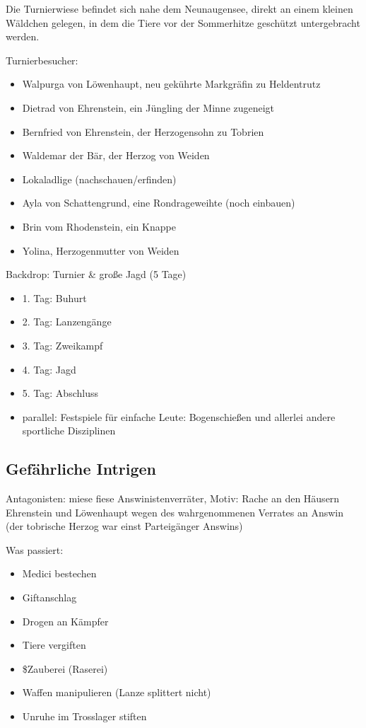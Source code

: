 Die Turnierwiese befindet sich nahe dem Neunaugensee, direkt an einem kleinen Wäldchen gelegen, in dem die Tiere vor der Sommerhitze geschützt untergebracht werden.

Turnierbesucher: 

\begin{itemize}
	\item Walpurga von Löwenhaupt, neu gekührte Markgräfin zu Heldentrutz
	\item Dietrad von Ehrenstein, ein Jüngling der Minne zugeneigt
	\item Bernfried von Ehrenstein, der Herzogensohn zu Tobrien
	\item Waldemar der Bär, der Herzog von Weiden
	\item Lokaladlige (nachschauen/erfinden)
	\item Ayla von Schattengrund, eine Rondrageweihte (noch einbauen)
	\item Brin vom Rhodenstein, ein Knappe
	\item Yolina, Herzogenmutter von Weiden
\end{itemize}

Backdrop: Turnier \& große Jagd (5 Tage)

\begin{itemize}
	\item 1. Tag: Buhurt
	\item 2. Tag: Lanzengänge
	\item 3. Tag: Zweikampf
	\item 4. Tag: Jagd
	\item 5. Tag: Abschluss
	\item parallel: Festspiele für einfache Leute: Bogenschießen und allerlei andere sportliche Disziplinen
\end{itemize}

\subsection{Gefährliche Intrigen}

Antagonisten: miese fiese Answinistenverräter, Motiv: Rache an den Häusern Ehrenstein und Löwenhaupt wegen des wahrgenommenen Verrates an Answin (der tobrische Herzog war einst Parteigänger Answins)

Was passiert:

\begin{itemize}
	\item Medici bestechen
	\item Giftanschlag
	\item Drogen an Kämpfer
	\item Tiere vergiften
	\item \$Zauberei (Raserei)
	\item Waffen manipulieren (Lanze splittert nicht)
	\item Unruhe im Trosslager stiften
\end{itemize}

